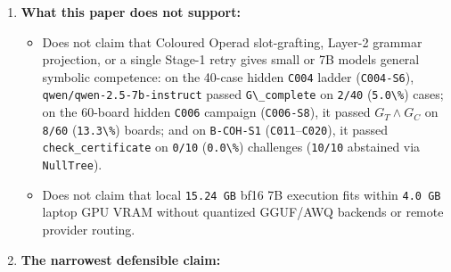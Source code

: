 \documentclass[
  11pt,
]{article}
\newcommand{\passthrough}[1]{#1}
\providecommand{\tightlist}{%
  \setlength{\itemsep}{0pt}\setlength{\parskip}{0pt}}
\begin{document}
\begin{enumerate}
\begin{itemize}
    \passthrough{\lstinline!P*!} staged slot materialization with
    complete deterministic Stage-1 guards and
    \passthrough{\lstinline!NullTree!} abstention achieved
    \textbf{\passthrough{\lstinline!40/40!}
    (\passthrough{\lstinline!100.0\%!}) conditional Stage-2 precision}
    (\passthrough{\lstinline!0!} admitted false
    \passthrough{\lstinline!SOLVED!} verdicts across
    \passthrough{\lstinline!242!} guarded \nolinkurl{board/challenge}
    evaluations), caught \passthrough{\lstinline!3!} additional Local
    Green / Global Red witnesses on the 40-case hidden
    \passthrough{\lstinline!C004!} ladder and
    \passthrough{\lstinline!10/10!} false
    \passthrough{\lstinline!SOLVED!} status claims on
    \passthrough{\lstinline!B-COH-S1!}, and prevented
    \passthrough{\lstinline!208!} wasted downstream turns on the
    60-board hidden \passthrough{\lstinline!C006!} campaign.
  \end{itemize}
\item
  \textbf{What this paper does not support:}

  \begin{itemize}
  \tightlist
  \item
    Does not claim that Coloured Operad slot-grafting, Layer-2 grammar
    projection, or a single Stage-1 retry gives small or 7B models
    general symbolic competence: on the 40-case hidden
    \passthrough{\lstinline!C004!} ladder
    (\passthrough{\lstinline!C004-S6!}),
    \nolinkurl{qwen/qwen-2.5-7b-instruct} passed
    \passthrough{\lstinline!G\_complete!} on
    \passthrough{\lstinline!2/40!} (\passthrough{\lstinline!5.0\%!})
    cases; on the 60-board hidden \passthrough{\lstinline!C006!}
    campaign (\passthrough{\lstinline!C006-S8!}), it passed
    \(G_T \wedge G_C\) on \passthrough{\lstinline!8/60!}
    (\passthrough{\lstinline!13.3\%!}) boards; and on
    \passthrough{\lstinline!B-COH-S1!}
    (\passthrough{\lstinline!C011!}--\passthrough{\lstinline!C020!}), it
    passed \nolinkurl{check_certificate} on
    \passthrough{\lstinline!0/10!} (\passthrough{\lstinline!0.0\%!})
    challenges (\passthrough{\lstinline!10/10!} abstained via
    \passthrough{\lstinline!NullTree!}).
  \item
    Does not claim that local \passthrough{\lstinline!15.24 GB!} bf16 7B
    execution fits within \passthrough{\lstinline!4.0 GB!} laptop GPU
    VRAM without quantized GGUF/AWQ backends or remote provider routing.
  \end{itemize}
\item
  \textbf{The narrowest defensible claim:}


\end{enumerate}
\end{document}
